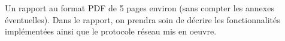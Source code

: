 Un rapport au format PDF de 5 pages environ (sans compter les annexes éventuelles). Dans le rapport, on prendra soin de décrire les fonctionnalités implémentées ainsi que le protocole réseau mis en oeuvre.
